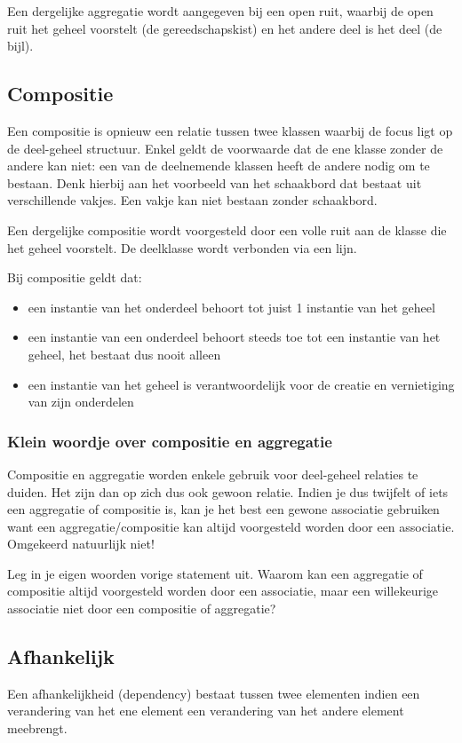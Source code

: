 Een dergelijke aggregatie wordt aangegeven bij een open ruit, waarbij de  open ruit het 
geheel voorstelt (de gereedschapskist) en het andere deel is het deel (de bijl).

\subsection{Compositie}
Een compositie is opnieuw een relatie tussen twee klassen waarbij de focus ligt op de 
deel-geheel structuur. Enkel geldt de voorwaarde dat de ene klasse zonder de andere kan
niet: een van de deelnemende klassen heeft de andere nodig om te bestaan. Denk hierbij
aan het voorbeeld van het schaakbord dat bestaat uit verschillende vakjes. Een vakje
kan niet bestaan zonder schaakbord.

Een dergelijke compositie wordt voorgesteld door een volle ruit aan de klasse die het geheel
voorstelt. De deelklasse wordt verbonden via een lijn.

Bij compositie geldt dat:
\begin{itemize}
	\item een instantie van het onderdeel behoort tot juist 1 instantie van het geheel
	\item een instantie van een onderdeel behoort steeds toe tot een instantie van het geheel, het bestaat dus nooit alleen
	\item een instantie van het geheel is verantwoordelijk voor de creatie en vernietiging van zijn onderdelen
\end{itemize}

\subsubsection{Klein woordje over compositie en aggregatie}
Compositie en aggregatie worden enkele gebruik voor deel-geheel relaties te duiden. Het zijn
dan op zich dus ook gewoon relatie. Indien je dus twijfelt of iets een aggregatie
of compositie is, kan je het best een gewone associatie gebruiken want een aggregatie/compositie kan altijd voorgesteld worden door een associatie. Omgekeerd natuurlijk niet!

\begin{exercise}
	Leg in je eigen woorden vorige statement uit. Waarom kan een aggregatie of compositie altijd voorgesteld worden door een associatie, maar een willekeurige associatie niet door een compositie of aggregatie?
\end{exercise}

\subsection{Afhankelijk}
Een afhankelijkheid (dependency) bestaat tussen twee elementen indien een verandering van het ene element een verandering van het andere element meebrengt. 

